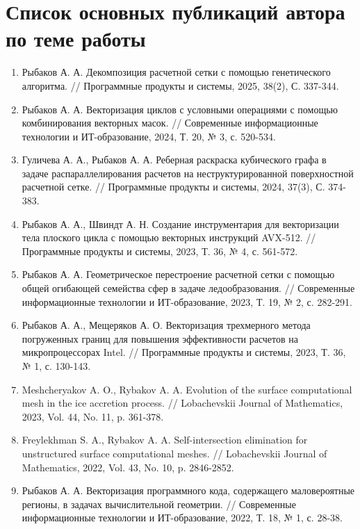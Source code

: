 \documentclass[a4paper,14pt]{extarticle}                     %
\theoremstyle{plain}                                         %
\begin{document}

\section*{Список основных публикаций автора по теме работы}

\begin{enumerate}[noitemsep,topsep=0pt,parsep=0pt,partopsep=0pt]
\item Рыбаков А. А. Декомпозиция расчетной сетки с помощью генетического алгоритма. // Программные продукты и системы, 2025, 38(2), С. 337-344.
\item Рыбаков А. А. Векторизация циклов с условными операциями с помощью комбинирования векторных масок. // Современные информационные технологии и ИТ-образование, 2024, Т. 20, № 3, с. 520-534.
\item Гуличева А. А., Рыбаков А. А. Реберная раскраска кубического графа в задаче распараллелирования расчетов на неструктурированной поверхностной расчетной сетке. // Программные продукты и системы, 2024, 37(3), С. 374-383.
\item Рыбаков А. А., Швиндт А. Н. Создание инструментария для векторизации тела плоского цикла с помощью векторных инструкций AVX-512. // Программные продукты и системы, 2023, Т. 36, № 4, с. 561-572.
\item Рыбаков А. А. Геометрическое перестроение расчетной сетки с помощью общей огибающей семейства сфер в задаче ледообразования. // Современные информационные технологии и ИТ-образование, 2023, Т. 19, № 2, с. 282-291.
\item Рыбаков А. А., Мещеряков А. О. Векторизация трехмерного метода погруженных границ для повышения эффективности расчетов на микропроцессорах Intel. // Программные продукты и системы, 2023, Т. 36, № 1, с. 130-143.
\item Meshcheryakov A. O., Rybakov A. A. Evolution of the surface computational mesh in the ice accretion process. // Lobachevskii Journal of Mathematics, 2023, Vol. 44, No. 11, p. 361-378.
\item Freylekhman S. A., Rybakov A. A. Self-intersection elimination for unstructured surface computational meshes. // Lobachevskii Journal of Mathematics, 2022, Vol. 43, No. 10, p. 2846-2852.
\item Рыбаков А. А. Векторизация программного кода, содержащего маловероятные регионы, в задачах вычислительной геометрии. // Современные информационные технологии и ИТ-образование, 2022, Т. 18, № 1, с. 28-38.

\end{enumerate}
\end{document}
